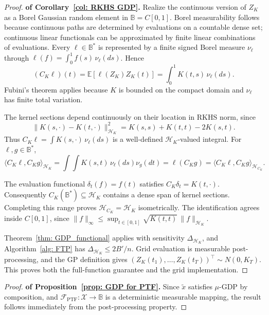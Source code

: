 \begin{proof}\textbf{of Corollary~\ref{col: RKHS GDP}.}
Realize the continuous version of $Z_K$ as a Borel Gaussian random element in $\mathbb B=C[0,1]$. Borel measurability follows because continuous paths are determined by evaluations on a countable dense set; continuous linear functionals can be approximated by finite linear combinations of evaluations. Every $\ell\in\mathbb B^*$ is represented by a finite signed Borel measure $\nu_\ell$ through $\ell(f)=\int_0^1 f(s)\,\nu_\ell(ds)$. Hence
\[
(C_K\ell)(t)=\mathbb E[\ell(Z_K)Z_K(t)]
=\int_0^1 K(t,s)\,\nu_\ell(ds).
\]
Fubini's theorem applies because $K$ is bounded on the compact domain and $\nu_\ell$ has finite total variation.

The kernel sections depend continuously on their location in RKHS norm, since
\[
\|K(s,\cdot)-K(t,\cdot)\|_{\mathcal H_K}^2
=K(s,s)+K(t,t)-2K(s,t).
\]
Thus $C_K\ell=\int K(s,\cdot)\,\nu_\ell(ds)$ is a well-defined $\mathcal H_K$-valued integral. For $\ell,g\in\mathbb B^*$,
\[
\langle C_K\ell,C_Kg\rangle_{\mathcal H_K}
=\int\!\int K(s,t)\,\nu_\ell(ds)\nu_g(dt)
=\ell(C_Kg)
=\langle C_K\ell,C_Kg\rangle_{\mathcal H_{C_K}}.
\]

The evaluation functional $\delta_t(f)=f(t)$ satisfies $C_K\delta_t=K(t,\cdot)$. Consequently $C_K(\mathbb B^*)\subseteq\mathcal H_K$ contains a dense span of kernel sections. Completing this range proves $\mathcal H_{C_K}=\mathcal H_K$ isometrically. The identification agrees inside $C[0,1]$, since $\|f\|_\infty\le\sup_{t\in[0,1]}\sqrt{K(t,t)}\,\|f\|_{\mathcal H_K}$.

Theorem~\ref{thm: GDP_functional} applies with sensitivity $\Delta_{\mathcal{H}_K}$, and Algorithm~\ref{alg: FTP} has $\Delta_{\mathcal{H}_K}\le2B'/n$. Grid evaluation is measurable post-processing, and the GP definition gives $(Z_K(t_1),\ldots,Z_K(t_T))^\top\sim N(0,K_T)$. This proves both the full-function guarantee and the grid implementation.
\end{proof}

\begin{proof}\textbf{of Proposition~\ref{prop: GDP for PTF}.}
Since $\widetilde{x}$ satisfies $\mu$-GDP by composition, and $\mathcal F_{\mathrm{PTF}}:\mathcal X\rightarrow\mathbb{B}$ is a deterministic measurable mapping, the result follows immediately from the post-processing property.
\end{proof}